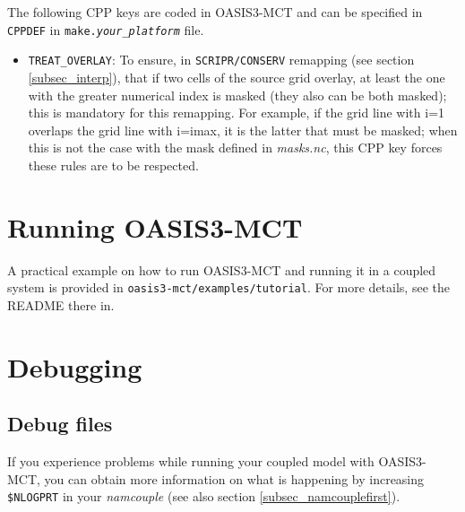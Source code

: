 The following CPP keys are coded in OASIS3-MCT and
can be specified in {\tt CPPDEF} in {\tt make.{\it your\_platform}} file.

\begin{itemize}

\item {\tt TREAT\_OVERLAY}: To ensure, in {\tt SCRIPR/CONSERV} remapping (see section
  \ref{subsec_interp}), that if two cells of the source grid overlay,
  at least the one with the greater numerical index is masked (they
  also can be both masked); this is mandatory for this remapping. For
  example, if the grid line with i=1 overlaps the grid line with
  i=imax, it is the latter that must be masked; when this is not the
  case with the mask defined in {\it masks.nc}, this CPP key forces
  these rules are to be respected.
\end{itemize}

\section{Running OASIS3-MCT}
\label{subsec_running}

A practical example on how to run OASIS3-MCT and running it in a
coupled system is provided in {\tt oasis3-mct/examples/tutorial}. For
more details, see the README there in.

\section{Debugging}
\label{subsec_debug}

\subsection{Debug files}
If you experience problems while running your coupled model with
OASIS3-MCT, you can obtain more information on what is happening by increasing {\tt \$NLOGPRT} 
in your {\it namcouple} (see also section \ref{subsec_namcouplefirst}).

